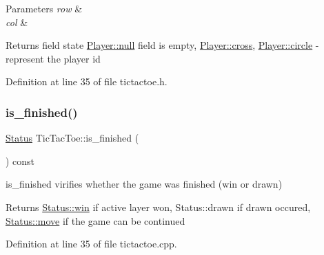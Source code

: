 \begin{DoxyParams}{Parameters}
{\em row} & \\
\hline
{\em col} & \\
\hline
\end{DoxyParams}
\begin{DoxyReturn}{Returns}
field state \hyperlink{common__defs_8h_a9c8780378078e51e7c9041cbac392db9a37a6259cc0c1dae299a7866489dff0bd}{Player\+::null} field is empty, \hyperlink{common__defs_8h_a9c8780378078e51e7c9041cbac392db9a22aadb26447d87b550b155a4d764fad0}{Player\+::cross}, \hyperlink{common__defs_8h_a9c8780378078e51e7c9041cbac392db9a9b6ddeba5b33e577c07c35d8505c6072}{Player\+::circle} -\/ represent the player id 
\end{DoxyReturn}


Definition at line 35 of file tictactoe.\+h.

\mbox{\label{class_tic_tac_toe_a592cbbdeee049391313a0712ca12589c}} 
\subsubsection{\texorpdfstring{is\+\_\+finished()}{is\_finished()}}
{\footnotesize\ttfamily \hyperlink{common__defs_8h_a67a0db04d321a74b7e7fcfd3f1a3f70b}{Status} Tic\+Tac\+Toe\+::is\+\_\+finished (\begin{DoxyParamCaption}{ }\end{DoxyParamCaption}) const\hspace{0.3cm}{\ttfamily [protected]}}



is\+\_\+finished virifies whether the game was finished (win or drawn) 

\begin{DoxyReturn}{Returns}
\hyperlink{common__defs_8h_a67a0db04d321a74b7e7fcfd3f1a3f70ba0b08bd98d279b88859b628cd8c061ae0}{Status\+::win} if active layer won, Status\+::drawn if drawn occured, \hyperlink{common__defs_8h_a67a0db04d321a74b7e7fcfd3f1a3f70ba3734a903022249b3010be1897042568e}{Status\+::move} if the game can be continued 
\end{DoxyReturn}


Definition at line 35 of file tictactoe.\+cpp.

\mbox{\label{class_tic_tac_toe_a5bbb9eeb1ab08a3d9ce857cecc3d7ffc}} 
